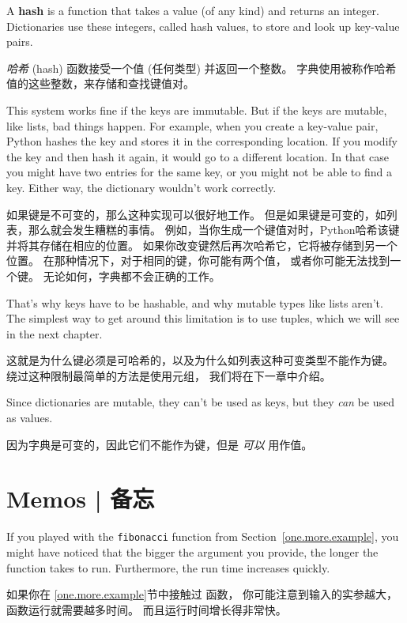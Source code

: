   

A {\bf hash} is a function that takes a value (of any kind)
and returns an integer.  Dictionaries use these integers,
called hash values, to store and look up key-value pairs.


{\em 哈希} (hash) 函数接受一个值 (任何类型) 并返回一个整数。
字典使用被称作哈希值的这些整数，来存储和查找键值对。

This system works fine if the keys are immutable.  But if the
keys are mutable, like lists, bad things happen.  For example,
when you create a key-value pair, Python hashes the key and
stores it in the corresponding location.  If you modify the
key and then hash it again, it would go to a different location.
In that case you might have two entries for the same key,
or you might not be able to find a key.  Either way, the
dictionary wouldn't work correctly.

如果键是不可变的，那么这种实现可以很好地工作。
但是如果键是可变的，如列表，那么就会发生糟糕的事情。
例如，当你生成一个键值对时，Python哈希该键并将其存储在相应的位置。
如果你改变键然后再次哈希它，它将被存储到另一个位置。
在那种情况下，对于相同的键，你可能有两个值， 或者你可能无法找到一个键。
无论如何，字典都不会正确的工作。

That's why keys have to be hashable, and why mutable types like
lists aren't.  The simplest way to get around this limitation is to
use tuples, which we will see in the next chapter.

这就是为什么键必须是可哈希的，以及为什么如列表这种可变类型不能作为键。
绕过这种限制最简单的方法是使用元组， 我们将在下一章中介绍。

Since dictionaries are mutable, they can't be used as keys,
but they {\em can} be used as values.

因为字典是可变的，因此它们不能作为键，但是 {\em 可以} 用作值。


\section{Memos  |  备忘}
\label{memoize}

If you played with the {\tt fibonacci} function from
Section~\ref{one.more.example}, you might have noticed that the bigger
the argument you provide, the longer the function takes to run.
Furthermore, the run time increases quickly.

如果你在 \ref{one.more.example}节中接触过  函数， 你可能注意到输入的实参越大，函数运行就需要越多时间。
而且运行时间增长得非常快。

